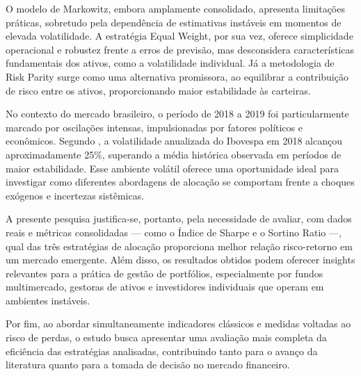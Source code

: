 O modelo de Markowitz, embora amplamente consolidado, apresenta limitações práticas, sobretudo pela dependência de estimativas instáveis em momentos de elevada volatilidade. A estratégia Equal Weight, por sua vez, oferece simplicidade operacional e robustez frente a erros de previsão, mas desconsidera características fundamentais dos ativos, como a volatilidade individual. Já a metodologia de Risk Parity surge como uma alternativa promissora, ao equilibrar a contribuição de risco entre os ativos, proporcionando maior estabilidade às carteiras.

No contexto do mercado brasileiro, o período de 2018 a 2019 foi particularmente marcado por oscilações intensas, impulsionadas por fatores políticos e econômicos. Segundo \cite{gregorio2020volatilidade}, a volatilidade anualizada do Ibovespa em 2018 alcançou aproximadamente 25\%, superando a média histórica observada em períodos de maior estabilidade. Esse ambiente volátil oferece uma oportunidade ideal para investigar como diferentes abordagens de alocação se comportam frente a choques exógenos e incertezas sistêmicas.

A presente pesquisa justifica-se, portanto, pela necessidade de avaliar, com dados reais e métricas consolidadas --- como o Índice de Sharpe e o Sortino Ratio ---, qual das três estratégias de alocação proporciona melhor relação risco-retorno em um mercado emergente. Além disso, os resultados obtidos podem oferecer insights relevantes para a prática de gestão de portfólios, especialmente por fundos multimercado, gestoras de ativos e investidores individuais que operam em ambientes instáveis.

Por fim, ao abordar simultaneamente indicadores clássicos e medidas voltadas ao risco de perdas, o estudo busca apresentar uma avaliação mais completa da eficiência das estratégias analisadas, contribuindo tanto para o avanço da literatura quanto para a tomada de decisão no mercado financeiro.